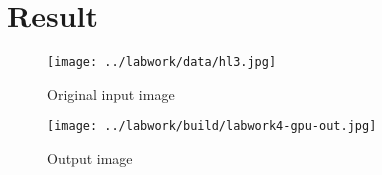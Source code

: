 \documentclass{article}
\begin{document}
\section*{Result}
\begin{figure}[h]
\center\texttt{[image: ../labwork/data/hl3.jpg]}
\caption{Original input image}
\end{figure}
\begin{figure}[h]
\center\texttt{[image: ../labwork/build/labwork4-gpu-out.jpg]}
\caption{Output image}
\end{figure}
\end{document}
